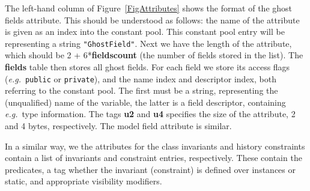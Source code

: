 The left-hand column of Figure~\ref{FigAttributes} shows the format of
the ghost fields attribute. This should be understood as follows: the
name of the attribute is given as an index into the constant
pool. This constant pool entry will be representing a string
\texttt{"Ghost\unsc Field"}. Next we have the length of the attribute,
which should be 2 + 6*\textbf{fields\unsc count} (the number of fields
stored in the list). The \textbf{fields} table then stores all ghost
fields. For each field we store its access flags (\emph{e.g.}\
\texttt{public} or
\texttt{private}), and the name index and descriptor index, both
referring to the constant pool. The first must be a string,
representing the (unqualified) name of the variable, the latter is a
field descriptor, containing \emph{e.g.}\ type information.  The tags
\textbf{u2} and \textbf{u4} specifies the size of the attribute, 2 and
4 bytes, respectively. The model field attribute is similar.

In a similar way, we the attributes for 
the class invariants and history constraints contain a list of
invariants and constraint entries, respectively. These contain the
predicates, a tag whether the invariant (constraint) is defined over
instances or static, and appropriate visibility modifiers.



